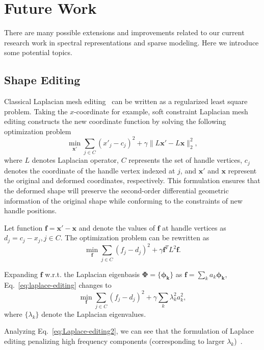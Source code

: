 \section{Future Work}

There are many possible extensions and improvements related to our current research 
work in spectral representations and sparse modeling. Here we introduce some 
potential topics. 

\subsection*{Shape Editing}

Classical Laplacian mesh editing~\cite{Botsch2008} can be written as a regularized least square
problem. Taking the $x$-coordinate for example, soft constraint Laplacian mesh editing
constructs the new coordinate function by solving the following optimization problem
\begin{equation}
\min_\mathbf{x'} \sum_{j\in C} (x'_j - c_j)^2 + \gamma\|L\mathbf{x'}-L\mathbf{x}\|_2^2,
\end{equation}
where $L$ denotes Laplacian operator, $C$ represents the set of handle vertices, $c_j$ denotes the
coordinate of the handle vertex indexed at $j$, and $\mathbf{x'}$ and $\mathbf{x}$ represent the
original and deformed coordinates, respectively. This formulation ensures that the deformed shape
will preserve the second-order differential geometric information of the original shape while
conforming to the constraints of new handle positions.

Let function $\mathbf{f}=\mathbf{x'}-\mathbf{x}$ and denote the values of $\mathbf{f}$ at
handle vertices as $d_j = c_j - x_j, j\in C$. The optimization problem can be rewritten as
\begin{equation}
\label{eq:laplace-editing}
\min_\mathbf{f} \sum_{j\in C} (f_j - d_j)^2 + \gamma \mathbf{f}^T L^2 \mathbf{f}.
\end{equation}

Expanding $\mathbf{f}$ w.r.t. the Laplacian eigenbasis $\mathbf{\Phi}=\{\mathbf{\phi_k}\}$
as $\mathbf{f}=\sum_k a_k \mathbf{\phi_k}$, Eq.~\ref{eq:laplace-editing} changes to
\begin{equation}
\label{eq:Laplace-editing2}
\min_\mathbf{f} \sum_{j\in C} (f_j - d_j)^2 + \gamma \sum_k \lambda_k^2 a_k^2,
\end{equation}
where $\{\lambda_k\}$ denote the Laplacian eigenvalues.

Analyzing Eq.~\ref{eq:Laplace-editing2}, we can see that the formulation of Laplace
editing penalizing high frequency components (corresponding to larger
$\lambda_k$)~\cite{Rustamov:2009:ICMS}.

